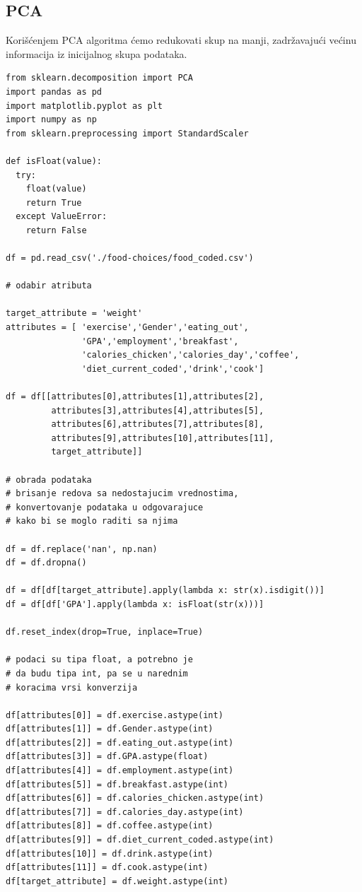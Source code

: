 \documentclass[12pt,a4paper]{article}
\begin{document}
\subsection{PCA}


Kori\v s\' cenjem PCA algoritma \' cemo redukovati skup na manji, zadr\v zavaju\' ci ve\' cinu informacija iz inicijalnog skupa podataka.

\begin{lstlisting}
from sklearn.decomposition import PCA
import pandas as pd
import matplotlib.pyplot as plt
import numpy as np
from sklearn.preprocessing import StandardScaler

def isFloat(value):
  try:
    float(value)
    return True
  except ValueError:
    return False

df = pd.read_csv('./food-choices/food_coded.csv')

# odabir atributa

target_attribute = 'weight'
attributes = [ 'exercise','Gender','eating_out',
               'GPA','employment','breakfast', 
               'calories_chicken','calories_day','coffee',
               'diet_current_coded','drink','cook']

df = df[[attributes[0],attributes[1],attributes[2],
         attributes[3],attributes[4],attributes[5],
         attributes[6],attributes[7],attributes[8],
         attributes[9],attributes[10],attributes[11],
         target_attribute]]

# obrada podataka
# brisanje redova sa nedostajucim vrednostima,
# konvertovanje podataka u odgovarajuce
# kako bi se moglo raditi sa njima

df = df.replace('nan', np.nan)
df = df.dropna()

df = df[df[target_attribute].apply(lambda x: str(x).isdigit())]
df = df[df['GPA'].apply(lambda x: isFloat(str(x)))]

df.reset_index(drop=True, inplace=True)

# podaci su tipa float, a potrebno je
# da budu tipa int, pa se u narednim
# koracima vrsi konverzija

df[attributes[0]] = df.exercise.astype(int)
df[attributes[1]] = df.Gender.astype(int)
df[attributes[2]] = df.eating_out.astype(int)
df[attributes[3]] = df.GPA.astype(float)
df[attributes[4]] = df.employment.astype(int)
df[attributes[5]] = df.breakfast.astype(int)
df[attributes[6]] = df.calories_chicken.astype(int)
df[attributes[7]] = df.calories_day.astype(int)
df[attributes[8]] = df.coffee.astype(int)
df[attributes[9]] = df.diet_current_coded.astype(int)
df[attributes[10]] = df.drink.astype(int)
df[attributes[11]] = df.cook.astype(int)
df[target_attribute] = df.weight.astype(int)


\end{lstlisting}
\end{document}
